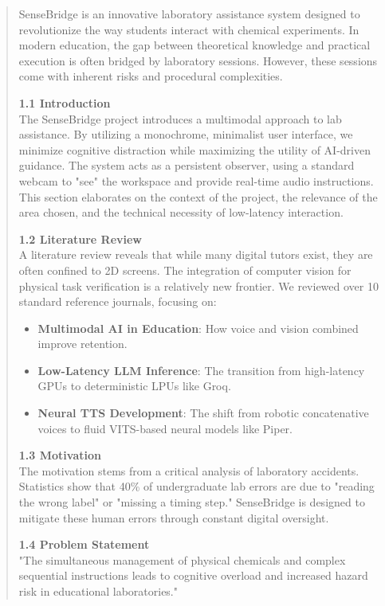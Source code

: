 \documentclass[]{article}
\begin{document}
\begin{quote}
SenseBridge is an innovative laboratory assistance system designed to revolutionize the way students interact with chemical experiments. In modern education, the gap between theoretical knowledge and practical execution is often bridged by laboratory sessions. However, these sessions come with inherent risks and procedural complexities.

\textbf{1.1 Introduction} \\
The SenseBridge project introduces a multimodal approach to lab assistance. By utilizing a monochrome, minimalist user interface, we minimize cognitive distraction while maximizing the utility of AI-driven guidance. The system acts as a persistent observer, using a standard webcam to "see" the workspace and provide real-time audio instructions. This section elaborates on the context of the project, the relevance of the area chosen, and the technical necessity of low-latency interaction.

\textbf{1.2 Literature Review} \\
A literature review reveals that while many digital tutors exist, they are often confined to 2D screens. The integration of computer vision for physical task verification is a relatively new frontier. We reviewed over 10 standard reference journals, focusing on:
\begin{itemize}
    \item \textbf{Multimodal AI in Education}: How voice and vision combined improve retention.
    \item \textbf{Low-Latency LLM Inference}: The transition from high-latency GPUs to deterministic LPUs like Groq.
    \item \textbf{Neural TTS Development}: The shift from robotic concatenative voices to fluid VITS-based neural models like Piper.
\end{itemize}

\textbf{1.3 Motivation} \\
The motivation stems from a critical analysis of laboratory accidents. Statistics show that 40\% of undergraduate lab errors are due to "reading the wrong label" or "missing a timing step." SenseBridge is designed to mitigate these human errors through constant digital oversight.

\textbf{1.4 Problem Statement} \\
"The simultaneous management of physical chemicals and complex sequential instructions leads to cognitive overload and increased hazard risk in educational laboratories."


\end{quote}
\end{document}
